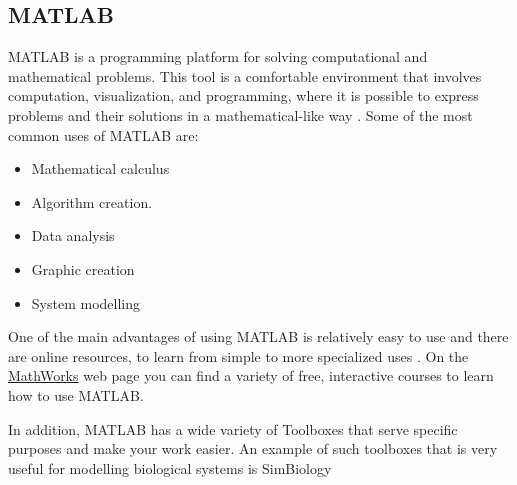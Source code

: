 \documentclass[11pt, letterpaper, english]{article}
\begin{document}
    \subsection{MATLAB}
    \par{MATLAB is a programming platform for solving computational and mathematical problems. This tool is a comfortable environment that involves computation, visualization, and programming, where it is possible to express problems and their solutions in a mathematical-like way \cite{gilat_2017}. Some of the most common uses of MATLAB are:}
    \begin{itemize}
        \item Mathematical calculus
        \item Algorithm creation.
        \item Data analysis
        \item Graphic creation
        \item System modelling
    \end{itemize} 
    \par{One of the main advantages of using MATLAB is relatively easy to use and there are online resources, to learn from simple to more specialized uses \cite{Kirouac2019}. On the \href{https://la.mteensrks.com/support/learn-with-matlab-tutorials,.html}{MathWorks}  web page you can find a variety of free, interactive courses to learn how to use MATLAB.}
    \par{In addition, MATLAB has a wide variety of Toolboxes that serve specific purposes and make your work easier. An example of such toolboxes that is very useful for modelling biological systems is SimBiology \cite{Park2019}}
\end{document}
